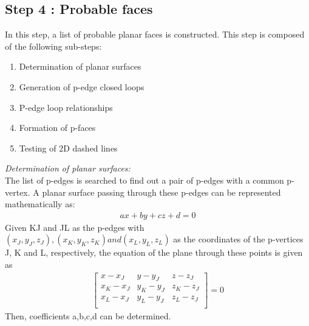 \documentclass[
11pt, %
english, %
singlespacing, %
headsepline, %
]{MastersDoctoralThesis} %
\begin{document}
\subsection{Step 4 : Probable faces}
In this step, a list of probable planar faces is constructed.
This step is composed of the following sub-steps:
\begin{enumerate}
\item Determination of planar surfaces
\item Generation of p-edge closed loops
\item P-edge loop relationships
\item Formation of p-faces
\item Testing of 2D dashed lines
\end{enumerate}
\emph{Determination of planar surfaces:}\\
 The list of p-edges is searched to find out a pair of p-edges with a common p-vertex. A planar surface passing through these p-edges can be represented mathematically as: 
\begin{align*}
 ax+by+cz+d=0
\end{align*}
Given KJ and JL as the p-edges with $(x_J, y_J, z_J), (x_K, y_K, z_K) and (x_L, y_L, z_L)$ as the coordinates of the p-vertices J, K and L, respectively, the equation of the plane through these points is given as 
\begin{align*}
\begin{bmatrix}
x-x_J & y-y_J & z-z_J \\
x_K-x_J & y_K-y_J & z_K-z_J \\
x_L-x_J & y_L-y_J & z_L-z_J \\
\end{bmatrix} = 0
\end{align*}
Then, coefficients a,b,c,d can be determined.
\end{document}
